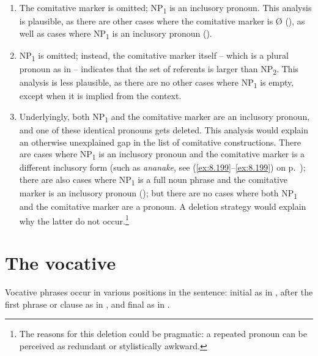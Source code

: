 \begin{enumerate}
\item 
The comitative marker is omitted; NP\textsubscript{1} is an inclusory pronoun. This analysis is plausible, as there are other cases where the comitative marker is Ø (), as well as cases where NP\textsubscript{1} is an inclusory pronoun ().

\item 
NP\textsubscript{1} is omitted; instead, the comitative marker itself – which is a plural pronoun as in  – indicates that the set of referents is larger than NP\textsubscript{2}. This analysis is less plausible, as there are no other cases where NP\textsubscript{1} is empty, except when it is implied from the context.

\item 
Underlyingly, both NP\textsubscript{1} and the comitative marker are an inclusory pronoun, and one of these identical pronouns gets deleted. This analysis would explain an otherwise unexplained gap in the list of comitative constructions. There are cases where NP\textsubscript{1} is an inclusory pronoun and the comitative marker is a different inclusory form (such as \textit{ananake}, see (\ref{ex:8.199}–\ref{ex:8.199}) on p.~\pageref{ex:8.199}); there are also cases where NP\textsubscript{1} is a full noun phrase and the comitative marker is an inclusory pronoun (); but there are no cases where both NP\textsubscript{1} and the comitative marker are a pronoun. A deletion strategy would explain why the latter do not occur.\footnote{\label{fn:452}The reasons for this deletion could be pragmatic: a repeated pronoun can be perceived as redundant or stylistically awkward.}

\end{enumerate}
\section{The vocative}\label{sec:8.11}
Vocative phrases occur in various positions in the sentence: initial as in , after the first phrase or clause as in , and final as in . 

